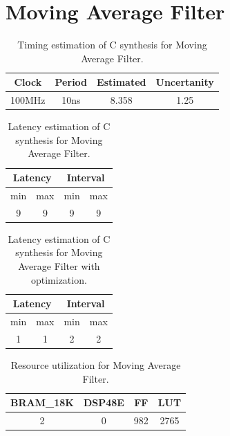 \documentclass[en,printmode]{mgr}
\begin{document}
	\section{Moving Average Filter}

	\begin{table}[H]
		\centering
		\caption{}
		\begin{tabular}{|c|c|c|c|}
		\hline
		Clock  & Period & Estimated & Uncertanity \\ \hline
		100MHz & 10ns   & 8.358     & 1.25        \\ \hline
		\end{tabular}
		\caption{Timing estimation of C synthesis for Moving Average Filter.}
	\end{table}
	
	\begin{table}[H]
		\centering
		\caption{}
		\begin{tabular}{|c|c|c|c|}
		\hline
		\multicolumn{2}{|c|}{Latency} & \multicolumn{2}{c|}{Interval} \\ \hline
			min           & max           & min           & max           \\ \hline
			9             & 9             & 9             & 9             \\ \hline
		\end{tabular}
		\caption{Latency estimation of C synthesis for Moving Average Filter.}
	\end{table}
	
	\begin{table}[H]
		\centering
		\caption{}
		\begin{tabular}{|c|c|c|c|}
		\hline
		\multicolumn{2}{|c|}{Latency} & \multicolumn{2}{c|}{Interval} \\ \hline
			min           & max           & min           & max           \\ \hline
			1             & 1             & 2             & 2             \\ \hline
		\end{tabular}
		\caption{Latency estimation of C synthesis for Moving Average Filter with optimization.}
	\end{table}

	\begin{table}[H]
		\centering
		\caption{}
		\begin{tabular}{|c|c|c|c|}
		\hline
		BRAM\_18K & DSP48E & FF  & LUT \\ \hline
		2         & 0      & 982 & 2765 \\ \hline
		\end{tabular}
		\caption{Resource utilization for Moving Average Filter.}
	\end{table}
	
\end{document}
